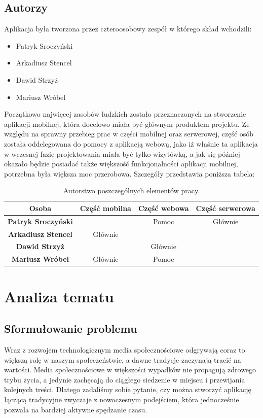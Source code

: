 \documentclass[a4paper,twoside,12pt]{book}
\begin{document}
\newpage

\section{Autorzy}
Aplikacja była tworzona przez czteroosobowy zespół w którego skład wchodzili: 
\begin{itemize}
    \item Patryk Sroczyński
    \item Arkadiusz Stencel
    \item Dawid Strzyż
    \item Mariusz Wróbel
\end{itemize}

Początkowo najwięcej zasobów ludzkich zostało przeznaczonych na stworzenie aplikacji mobilnej, która docelowo miała być głównym produktem projektu. Ze względu na sprawny przebieg prac w części mobilnej oraz serwerowej, część osób została oddelegowana do pomocy z aplikacją webową, jako iż właśnie ta aplikacja w wczesnej fazie projektowania miała być tylko wizytówką, a jak się później okazało będzie posiadać także większość funkcjonalności aplikacji mobilnej, potrzebna była większa moc przerobowa. Szczegóły przedstawia poniższa tabela:
\begin{table}[ht]
\centering
\begin{tabular}{|c|c|c|c|}
\hline
\textbf{Osoba} & \textbf{Część mobilna} & \textbf{Część webowa} & \textbf{Część serwerowa} \\ \hline
\textbf{Patryk Sroczyński}    &               & Pomoc            & Głównie      \\ \hline
\textbf{Arkadiusz Stencel}    & Głównie       &                  &              \\ \hline
\textbf{Dawid Strzyż}         &               & Głównie          &              \\ \hline
\textbf{Mariusz Wróbel}       & Głównie       & Pomoc            &              \\ \hline
\end{tabular}
\caption{Autorstwo poszczególnych elementów pracy.}
\end{table}


\chapter{Analiza tematu}

\section{Sformułowanie problemu}
Wraz z rozwojem technologicznym media społecznościowe odgrywają coraz to większą rolę w naszym społeczeństwie, a dawne tradycje zaczynają tracić na wartości. Media społecznościowe w większości wypadków nie propagują zdrowego trybu życia, a jedynie zachęcają do  ciągłego siedzenie w miejscu i przewijania kolejnych treści. Dlatego zadaliśmy sobie pytanie, czy można stworzyć aplikację łączącą tradycyjne zwyczaje z nowoczesnym podejściem, która jednocześnie pozwala na bardziej aktywne spędzanie czasu.
\end{document}

